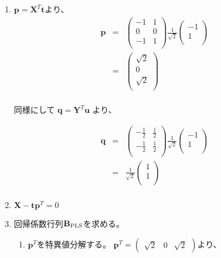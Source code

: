 \begin{enumerate}
\item \({\mathbf p}= {\mathbf X}^T{\mathbf t}\)より、
\begin{eqnarray*}
{\mathbf p} & = & 
\left(
\begin{array}{rr}
-1 & 1\\
 0 & 0\\
-1 & 1\\
\end{array}
\right)
\frac{1}{\sqrt{2}}
\left(
\begin{array}{r}
-1 \\
 1 \\
\end{array}
\right)\\
& = & 
\left(
\begin{array}{rr}
\sqrt{2} \\
 0 \\
\sqrt{2} \\
\end{array}
\right)\\
\end{eqnarray*}

同様にして \({\mathbf q}= {\mathbf Y}^T{\mathbf u}\) より、

\begin{eqnarray*}
{\mathbf q} & = & 
\left(
\begin{array}{rr}
-\frac{1}{2} & \frac{1}{2}\\
-\frac{1}{2} & \frac{1}{2}\\
\end{array}
\right)
\frac{1}{\sqrt{2}}
\left(
\begin{array}{r}
-1 \\
 1 \\
\end{array}
\right)\\
& = & 
\frac{1}{\sqrt{2}}
\left(
\begin{array}{rr}
1 \\
1 \\
\end{array}
\right)\\
\end{eqnarray*}

\item \({\mathbf X} - {\mathbf t}{\mathbf p}^T = 0\)

\item 回帰係数行列\({\mathbf B}_{\rm PLS}\)を求める。
\begin{enumerate}
\item \({\mathbf p}^T\)を特異値分解する。
\({\mathbf p}^T = \left(\begin{array}{rrr} \sqrt{2} & 0 & \sqrt{2}\end{array}\right)\)より、


\end{enumerate}
\end{enumerate}
